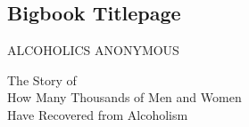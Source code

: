 

\begin{titlingpage}

\chapter{Bigbook Titlepage}

\vspace*{9em}

{\centering\Huge
        ALCOHOLICS ANONYMOUS \\
}

\vspace{5em}

{\hfill\itshape 

The Story of \\

How Many Thousands of Men and Women \\

Have Recovered from Alcoholism \\
}

\end{titlingpage}

